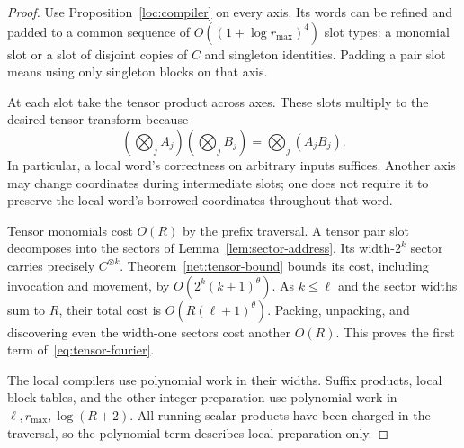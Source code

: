 \begin{proof}
Use Proposition~\ref{loc:compiler} on every axis. Its words can be refined and padded to a common sequence of $O((1+\log r_{\max})^4)$ slot types: a monomial slot or a slot of disjoint copies of $C$ and singleton identities. Padding a pair slot means using only singleton blocks on that axis.

At each slot take the tensor product across axes. These slots multiply to the desired tensor transform because
\begin{equation}\label{eq:tensor-multiply}
 (\bigotimes_j A_j)(\bigotimes_j B_j)=\bigotimes_j(A_jB_j).
\end{equation}
In particular, a local word's correctness on arbitrary inputs suffices. Another axis may change coordinates during intermediate slots; one does not require it to preserve the local word's borrowed coordinates throughout that word.

Tensor monomials cost $O(R)$ by the prefix traversal. A tensor pair slot decomposes into the sectors of Lemma~\ref{lem:sector-address}. Its width-$2^k$ sector carries precisely $C^{\otimes k}$. Theorem~\ref{net:tensor-bound} bounds its cost, including invocation and movement, by $O(2^k(k+1)^\theta)$. As $k\le\ell$ and the sector widths sum to $R$, their total cost is $O(R(\ell+1)^\theta)$. Packing, unpacking, and discovering even the width-one sectors cost another $O(R)$. This proves the first term of~\eqref{eq:tensor-fourier}.

The local compilers use polynomial work in their widths. Suffix products, local block tables, and the other integer preparation use polynomial work in $\ell,r_{\max},\log(R+2)$. All running scalar products have been charged in the traversal, so the polynomial term describes local preparation only.
\end{proof}
